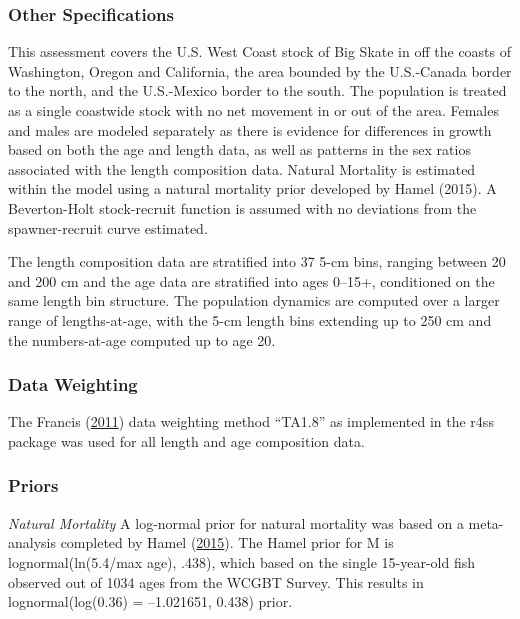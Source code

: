 \documentclass[12pt,]{article}
\begin{document}
\hypertarget{other-specifications}{%
\subsubsection{Other Specifications}\label{other-specifications}}

This assessment covers the U.S. West Coast stock of Big Skate in off the
coasts of Washington, Oregon and California, the area bounded by the
U.S.-Canada border to the north, and the U.S.-Mexico border to the
south. The population is treated as a single coastwide stock with no net
movement in or out of the area. Females and males are modeled separately
as there is evidence for differences in growth based on both the age and
length data, as well as patterns in the sex ratios associated with the
length composition data. Natural Mortality is estimated within the model
using a natural mortality prior developed by Hamel (2015). A
Beverton-Holt stock-recruit function is assumed with no deviations from
the spawner-recruit curve estimated.

The length composition data are stratified into 37 5-cm bins, ranging
between 20 and 200 cm and the age data are stratified into ages 0--15+,
conditioned on the same length bin structure. The population dynamics
are computed over a larger range of lengths-at-age, with the 5-cm length
bins extending up to 250 cm and the numbers-at-age computed up to age
20.

\hypertarget{data-weighting}{%
\subsubsection{Data Weighting}\label{data-weighting}}

The Francis (\protect\hyperlink{ref-Francis2011}{2011}) data weighting
method ``TA1.8'' as implemented in the r4ss package was used for all
length and age composition data.

\hypertarget{priors}{%
\subsubsection{Priors}\label{priors}}

\emph{Natural Mortality} A log-normal prior for natural mortality was
based on a meta-analysis completed by Hamel
(\protect\hyperlink{ref-Hamel2015}{2015}). The Hamel prior for M is
lognormal(ln(5.4/max age), .438), which based on the single 15-year-old
fish observed out of 1034 ages from the WCGBT Survey. This results in
lognormal(log(0.36) = --1.021651, 0.438) prior.
\end{document}
